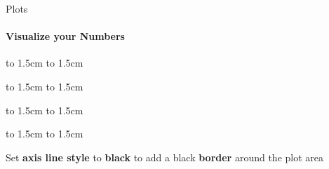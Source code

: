 \documentclass[aspectratio=169]{beamer}
\begin{document}
\begin{frame}{Plots}
    \framesubtitle{Visualize your Numbers}
    \begin{minipage}[t]{0.49\textwidth}
        \vspace{-1cm}

        \begin{minipage}[c]{0.14\textwidth}
            \begin{coloredblockdark}[blue][][][1.5cm]
               \vbox to 1.5cm {
                    \vfil
                        \hbox to 1.5cm {
                            \hfill
                                \large{}
                            \hfill
                        }
                    \vfil
                }
            \end{coloredblockdark}
            \begin{coloredblockdark}[yellow][][][1.5cm]
               \vbox to 1.5cm {
                    \vfil
                        \hbox to 1.5cm {
                            \hfill
                                \large{}
                            \hfill
                        }
                    \vfil
                }
            \end{coloredblockdark}
            \begin{coloredblockdark}[grey][][][1.5cm]
               \vbox to 1.5cm {
                    \vfil
                        \hbox to 1.5cm {
                            \hfill
                                \large{}
                            \hfill
                        }
                    \vfil
                }
            \end{coloredblockdark}
            \begin{coloredblockdark}[green][][][1.5cm]
               \vbox to 1.5cm {
                    \vfil
                        \hbox to 1.5cm {
                            \hfill
                                \large{}
                            \hfill
                        }
                    \vfil
                }
            \end{coloredblockdark}
        \end{minipage}
        \hfill
        \begin{minipage}[c]{0.84\textwidth}
            \begin{coloredblock}[blue][][][1.5cm]
                \footnotesize
                Set \textbf{axis line style} to \textbf{black} to add a black \textbf{border} around the plot area

\end{coloredblock}
\end{minipage}
\end{minipage}
\end{frame}
\end{document}
